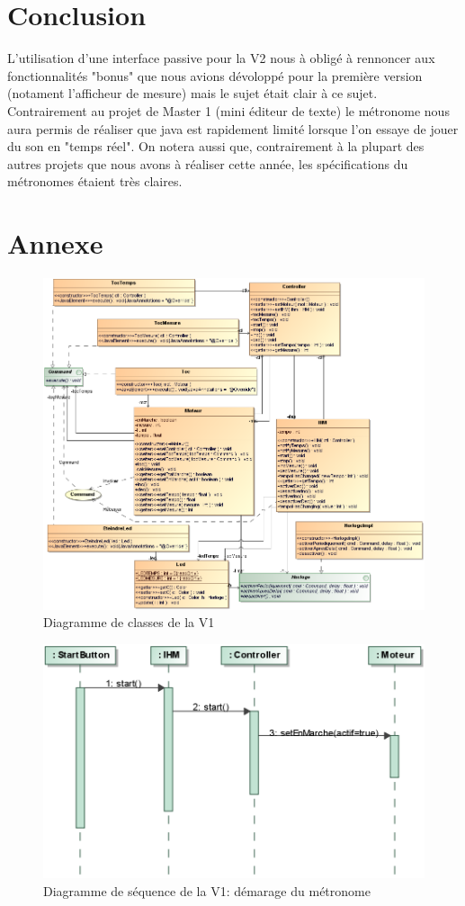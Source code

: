 \documentclass{article}
\begin{document}
\section{Conclusion}
L'utilisation d'une interface passive pour la V2 nous à obligé à rennoncer aux fonctionnalités "bonus" que nous avions dévoloppé pour la première version (notament l'afficheur de mesure) mais le sujet était clair à ce sujet.
Contrairement au projet de Master 1 (mini éditeur de texte) le métronome nous aura permis de réaliser que java est rapidement limité lorsque l'on essaye de jouer du son en "temps réel". On notera aussi que, contrairement à la plupart des autres projets que nous avons à réaliser cette année, les spécifications du métronomes étaient très claires.

\newpage
\section*{Annexe}
\begin{figure}[h]
   \caption{Diagramme de classes de la V1}
   \includegraphics[scale=0.75]{class_diagram_v1}
\end{figure}
\begin{figure}[h]
   \caption{Diagramme de séquence de la V1: démarage du métronome}
   \includegraphics[scale=0.55]{seq_diagram_v1}
\end{figure}
\end{document}

